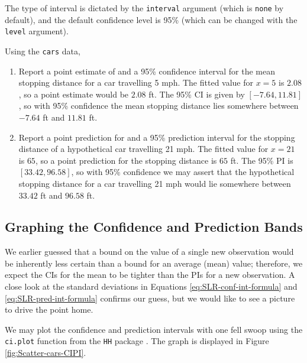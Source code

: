 \documentclass[captions=tableheading]{scrbook}
\begin{document}
The type of interval is dictated by the \texttt{interval} argument (which is \texttt{none} by default), and the default confidence level is 95\% (which can be changed with the \texttt{level} argument). 

\begin{example}
Using the \texttt{cars} data,
\begin{enumerate}
\item Report a point estimate of and a 95\% confidence interval for the mean stopping distance for a car travelling 5 mph.
   The fitted value for \(x=5\) is \(  2.08 \), so a point estimate would be \(  2.08 \) ft. The 95\% CI is given by \( [  -7.64,  11.81 ] \), so with 95\% confidence the mean stopping distance lies somewhere between \(  -7.64 \) ft and \(  11.81 \) ft.
\item Report a point prediction for and a 95\% prediction interval for the stopping distance of a hypothetical car travelling 21 mph.
   The fitted value for \(x = 21\) is \(  65 \), so a point prediction for the stopping distance is \(  65 \) ft. The 95\% PI is \( [  33.42,  96.58 ] \), so with 95\% confidence we may assert that the hypothetical stopping distance for a car travelling 21 mph would lie somewhere between \(  33.42 \) ft and \(  96.58 \) ft.
\end{enumerate}
\end{example}
\subsection{Graphing the Confidence and Prediction Bands}
\label{sec-11-2-6}


We earlier guessed that a bound on the value of a single new observation would be inherently less certain than a bound for an average (mean) value; therefore, we expect the CIs for the mean to be tighter than the PIs for a new observation. A close look at the standard deviations in Equations \ref{eq:SLR-conf-int-formula} and \ref{eq:SLR-pred-int-formula} confirms our guess, but we would like to see a picture to drive the point home.

We may plot the confidence and prediction intervals with one fell swoop using the \texttt{ci.plot} function from the \texttt{HH} package \cite{Heibergerhh}. The graph is displayed in Figure \ref{fig:Scatter-cars-CIPI}.
\end{document}
